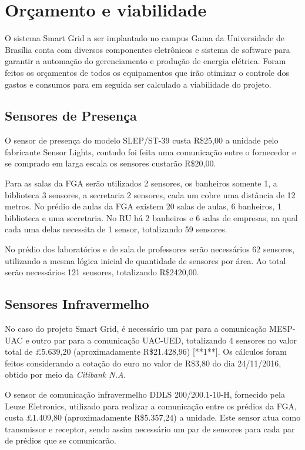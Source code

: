 \section{Orçamento e viabilidade}

O sistema Smart Grid a ser implantado no campus Gama da Universidade de Brasília conta com diversos componentes eletrônicos e sistema de software para garantir a automação do gerenciamento e produção de energia elétrica. Foram feitos os orçamentos de todos os equipamentos que irão otimizar o controle dos gastos e consumos para em seguida ser calculado a viabilidade do projeto.

\subsection{Sensores de Presença}
O sensor de presença do modelo SLEP/ST-39 custa R\$25,00 a unidade pelo fabricante Sensor Lights, contudo foi feita uma comunicação entre o fornecedor e se comprado em larga escala os sensores custarão R\$20,00.

Para as salas da FGA serão utilizados 2 sensores, os banheiros somente 1, a biblioteca 3 sensores, a secretaria 2 sensores, cada um cobre uma distância de 12 metros. No prédio de aulas da FGA existem 20 salas de aulas, 6 banheiros, 1 biblioteca e uma secretaria. No RU há 2 banheiros e 6 salas de empresas, na qual cada uma delas necessita de 1 sensor, totalizando 59 sensores.

No prédio dos laboratórios e de sala de professores serão necessários 62 sensores, utilizando a mesma lógica inicial de quantidade de sensores por área. Ao total serão necessários 121 sensores, totalizando R\$2420,00. 

\subsection{Sensores Infravermelho}
No caso do projeto Smart Grid, é necessário um par para a comunicação MESP-UAC e outro par para a comunicação UAC-UED, totalizando 4 sensores no valor total de £5.639,20 (aproximadamente R\$21.428,96) [**1**]. Os cálculos foram feitos considerando a cotação do euro no valor de R\$3,80 do dia 24/11/2016, obtido por meio da \textit{Citibank N.A}.

O sensor de comunicação infravermelho DDLS 200/200.1-10-H, fornecido pela Leuze Eletronics, utilizado para realizar a comunicação entre os prédios da FGA, custa £1.409,80 (aproximadamente R\$5.357,24) a unidade. Este sensor atua como transmissor e receptor, sendo assim necessário um par de sensores para cada par de prédios que se comunicarão.

